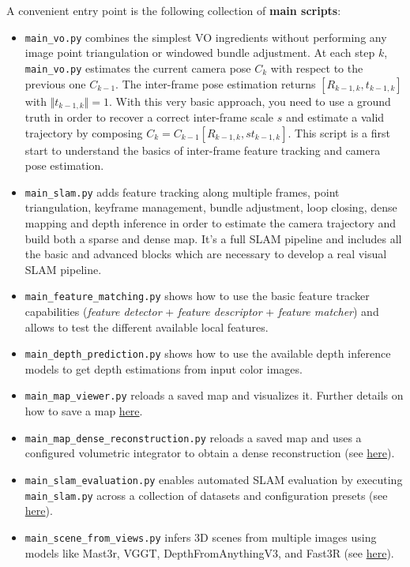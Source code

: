 \documentclass{article}
\begin{document}
A convenient entry point is the following collection of \textbf{main scripts}:
\begin{itemize}
\item 
\texttt{main\_vo.py} combines the simplest VO
ingredients without performing any image point triangulation or windowed
bundle adjustment. At each step \(k\), \texttt{main\_vo.py} estimates
the current camera pose \(C_k\) with respect to the previous one
\(C_{k-1}\). The inter-frame pose estimation returns
\([R_{k-1,k},t_{k-1,k}]\) with \(\Vert t_{k-1,k} \Vert=1\). With this
very basic approach, you need to use a ground truth in order to recover
a correct inter-frame scale \(s\) and estimate a valid trajectory by
composing \(C_k = C_{k-1} [R_{k-1,k}, s t_{k-1,k}]\). This script is a
first start to understand the basics of inter-frame feature tracking and
camera pose estimation.
\item
  \texttt{main\_slam.py} adds feature tracking along multiple frames,
  point triangulation, keyframe management, bundle adjustment, loop
  closing, dense mapping and depth inference in order to estimate the
  camera trajectory and build both a sparse and dense map. It's a full
  SLAM pipeline and includes all the basic and advanced blocks which are
  necessary to develop a real visual SLAM pipeline.
\item
  \texttt{main\_feature\_matching.py} shows how to use the basic feature
  tracker capabilities (\emph{feature detector} + \emph{feature
  descriptor} + \emph{feature matcher}) and allows to test the different
  available local features.
\item
  \texttt{main\_depth\_prediction.py} shows how to use the available
  depth inference models to get depth estimations from input color
  images.
\item
  \texttt{main\_map\_viewer.py} reloads a saved map and visualizes it.
  Further details on how to save a map
  \protect\hyperlink{reload-a-saved-map-and-relocalize-in-it}{here}.
\item
  \texttt{main\_map\_dense\_reconstruction.py} reloads a saved map and
  uses a configured volumetric integrator to obtain a dense
  reconstruction (see
  \protect\hyperlink{volumetric-reconstruction}{here}).
  \item
  \texttt{main\_slam\_evaluation.py} enables automated SLAM evaluation
  by executing \texttt{main\_slam.py} across a collection of datasets
  and configuration presets (see
  \protect\hyperlink{evaluating-slam}{here}).
  \item
  \texttt{main\_scene\_from\_views.py} infers 3D scenes from multiple
  images using models like Mast3r, VGGT, DepthFromAnythingV3, and Fast3R (see
  \protect\hyperlink{scene-from-views}{here}).
\end{itemize}
\end{document}
